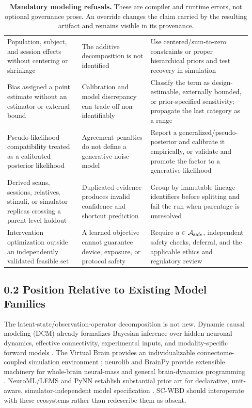 \begin{table}[t]
\begin{tabularx}{\textwidth}{@{}p{}p{}X@{}}
Population, subject, and session effects without centering or shrinkage &
The additive decomposition is not identified &
Use centered/sum-to-zero constraints or proper hierarchical priors and test
recovery in simulation\\

Bias assigned a point estimate without an estimator or external bound &
Calibration and model discrepancy can trade off non-identifiably &
Classify the term as design-estimable, externally bounded, or
prior-specified sensitivity; propagate the last category as a range\\

Pseudo-likelihood compatibility treated as a calibrated posterior likelihood &
Agreement penalties do not define a generative noise model &
Report a generalized/pseudo-posterior and calibrate it empirically, or validate
and promote the factor to a generative likelihood\\

Derived scans, sessions, relatives, stimuli, or simulator replicas crossing a
parent-level holdout &
Duplicated evidence produces invalid confidence and shortcut prediction &
Group by immutable lineage identifiers before splitting and fail the run when
parentage is unresolved\\

Intervention optimization outside an independently validated feasible set &
A learned objective cannot guarantee device, exposure, or protocol safety &
Require \(u\in\mathcal A_{\rm safe}\), independent safety checks, deferral,
and the applicable ethics and regulatory review\\
\bottomrule
\end{tabularx}
\caption{\textbf{Mandatory modeling refusals.} These are compiler and runtime
errors, not optional governance prose. An override changes the claim carried
by the resulting artifact and remains visible in its provenance.}
\label{tab:compiler-refusals}
\end{table}

\subsection{0.2 Position Relative to Existing Model Families}

The latent-state/observation-operator decomposition is not new. Dynamic causal
modeling (DCM) already formalizes Bayesian inference over hidden neuronal
dynamics, effective connectivity, experimental inputs, and modality-specific
forward models \citep{friston2003dcm}. The Virtual Brain provides an
individualizable connectome-coupled simulation environment
\citep{sanz2013,sanz2015}; neurolib and BrainPy provide extensible machinery
for whole-brain neural-mass and general brain-dynamics programming
\citep{cakan2023neurolib,wang2023brainpy}. NeuroML/LEMS and PyNN establish
substantial prior art for declarative, unit-aware, simulator-independent model
specification \citep{cannon2014lems,davison2009pynn}. SC-WBD should interoperate
with these ecosystems rather than redescribe them as absent.

